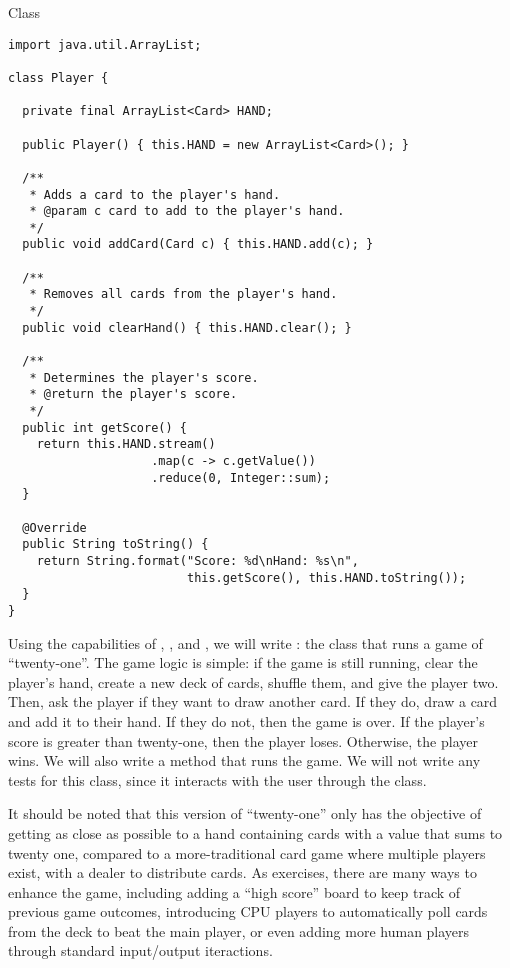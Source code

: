 \begin{cl}{ Class}
\begin{lstlisting}[language=MyJava]
import java.util.ArrayList;

class Player {

  private final ArrayList<Card> HAND;

  public Player() { this.HAND = new ArrayList<Card>(); }

  /**
   * Adds a card to the player's hand.
   * @param c card to add to the player's hand.
   */
  public void addCard(Card c) { this.HAND.add(c); }

  /**
   * Removes all cards from the player's hand.
   */
  public void clearHand() { this.HAND.clear(); }

  /**
   * Determines the player's score.
   * @return the player's score.
   */
  public int getScore() {
    return this.HAND.stream()
                    .map(c -> c.getValue())
                    .reduce(0, Integer::sum);
  }

  @Override
  public String toString() {
    return String.format("Score: %d\nHand: %s\n", 
                         this.getScore(), this.HAND.toString());
  }
}
\end{lstlisting}
\end{cl}

Using the capabilities of , , and , we will write : the class that runs a game of ``twenty-one''. The game logic is simple: if the game is still running, clear the player's hand, create a new deck of cards, shuffle them, and give the player two. Then, ask the player if they want to draw another card. If they do, draw a card and add it to their hand. If they do not, then the game is over. If the player's score is greater than twenty-one, then the player loses. Otherwise, the player wins. We will also write a  method that runs the game. We will not write any tests for this class, since it interacts with the user through the  class.

It should be noted that this version of ``twenty-one'' only has the objective of getting as close as possible to a hand containing cards with a value that sums to twenty one, compared to a more-traditional card game where multiple players exist, with a dealer to distribute cards. As exercises, there are many ways to enhance the game, including adding a ``high score'' board to keep track of previous game outcomes, introducing CPU players to automatically poll cards from the deck to beat the main player, or even adding more human players through standard input/output iteractions. 

